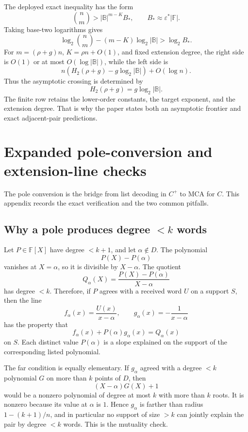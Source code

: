 \documentclass[11pt]{article}
\theoremstyle{definition}
\theoremstyle{remark}
\newcommand{\F}{\mathbb F}
\newcommand{\BB}{\mathbb B}
\newcommand{\epsstar}{\varepsilon^*}
\begin{document}
The deployed exact inequality has the form
\[
        \binom nm > |\BB|^{m-K} B_*,
        \qquad B_*\approx \epsstar |\F| .
\]
Taking base-two logarithms gives
\[
        \log_2\binom nm-(m-K)\log_2|\BB|>
        \log_2 B_* .
\]
For \(m=(\rho+g)n\), \(K=\rho n+O(1)\), and fixed extension degree, the right side is \(O(1)\) or at most \(O(\log |\BB|)\), while the left side is
\[
        n\left(H_2(\rho+g)-g\log_2|\BB|\right)+O(\log n).
\]
Thus the asymptotic crossing is determined by
\[
        H_2(\rho+g)=g\log_2|\BB|.
\]
The finite row retains the lower-order constants, the target exponent, and the extension degree.  That is why the paper states both an asymptotic frontier and exact adjacent-pair predictions.

\section{Expanded pole-conversion and extension-line checks}\label{app:pole-extension-expanded}

The pole conversion is the bridge from list decoding in \(C^+\) to MCA for \(C\).  This appendix records the exact verification and the two common pitfalls.

\subsection{Why a pole produces degree \texorpdfstring{\(<k\)}{<k} words}\label{appsub:pole-degree}

Let \(P\in\F[X]\) have degree \(<k+1\), and let \(\alpha\notin D\).  The polynomial
\[
        P(X)-P(\alpha)
\]
vanishes at \(X=\alpha\), so it is divisible by \(X-\alpha\).  The quotient
\[
        Q_\alpha(X)=\frac{P(X)-P(\alpha)}{X-\alpha}
\]
has degree \(<k\).  Therefore, if \(P\) agrees with a received word \(U\) on a support \(S\), then the line
\[
        f_\alpha(x)=\frac{U(x)}{x-\alpha},
        \qquad g_\alpha(x)=-\frac1{x-\alpha}
\]
has the property that
\[
        f_\alpha(x)+P(\alpha)g_\alpha(x)=Q_\alpha(x)
\]
on \(S\).  Each distinct value \(P(\alpha)\) is a slope explained on the support of the corresponding listed polynomial.

The far condition is equally elementary.  If \(g_\alpha\) agreed with a degree \(<k\) polynomial \(G\) on more than \(k\) points of \(D\), then
\[
        (X-\alpha)G(X)+1
\]
would be a nonzero polynomial of degree at most \(k\) with more than \(k\) roots.  It is nonzero because its value at \(\alpha\) is \(1\).  Hence \(g_\alpha\) is farther than radius \(1-(k+1)/n\), and in particular no support of size \(>k\) can jointly explain the pair by degree \(<k\) words.  This is the mutuality check.
\end{document}
